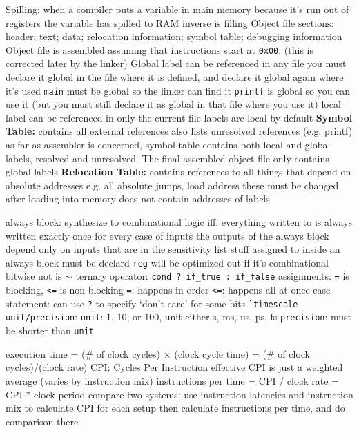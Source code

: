 \documentclass[12pt]{article}
\begin{document}
\begin{spacing}{0.8}
\begin{multicols*}{2}
\begin{flushleft}
\begin{outline}[longenum]
  \1 Spilling: when a compiler puts a variable in main memory because it's run out of registers
    \2 the variable has spilled to RAM
    \2 inverse is filling
  \1 Object file sections: header; text; data; relocation information; symbol table; debugging information
    \2 Object file is assembled assuming that instructions start at \verb|0x00|. (this is corrected later by the linker)
  \1 Global label can be referenced in any file
    \2 you must declare it global in the file where it is defined, and declare it global again where it's used
    \2 \verb|main| must be global so the linker can find it
    \2 \verb|printf| is global so you can use it (but you must still declare it as global in that file where you use it)
  \1 local label can be referenced in only the current file
    \2 labels are local by default
  \1 \textbf{Symbol Table:} contains all external references
    \2 also lists unresolved references (e.g. printf)
    \2 as far as assembler is concerned, symbol table contains both local and global labels, resolved and unresolved.
    \2 The final assembled object file only contains global labels
  \1 \textbf{Relocation Table:} contains references to all things that depend on absolute addresses
    \2 e.g. all absolute jumps, load address
    \2 these must be changed after loading into memory
    \2 does not contain addresses of labels



  \1 always block: synthesize to combinational logic iff:
    \2 everything written to is always written exactly once for every case of inputs
    \2 the outputs of the always block depend only on inputs that are in the sensitivity list
    \2 stuff assigned to inside an always block must be declard \verb|reg|
      \3 will be optimized out if it's combinational
  \1 bitwise not is $\sim$
  \1 ternary operator: \verb|cond ? if_true : if_false|
  \1 assignments: \verb|=| is blocking, \verb|<=| is non-blocking
    \2 \verb|=|: happens in order
    \2 \verb|<=|: happens all at once
  \1 case statement: can use \verb|?| to specify `don't care' for some bits
  \1 \verb|`timescale unit/precision|:
    \2 \verb|unit|: 1, 10, or 100, unit either s, ms, us, ps, fs
    \2 \verb|precision|: must be shorter than \verb|unit|

  \1 execution time = (\# of clock cycles) $\times$ (clock cycle time)
    = (\# of clock cycles)/(clock rate) 
  \1 CPI: Cycles Per Instruction
    \2 effective CPI is just a weighted average (varies by instruction mix)
  \1 instructions per time = CPI / clock rate = CPI * clock period
  \1 compare two systems:
    \2 use instruction latencies and instruction mix to calculate CPI for each setup
    \2 then calculate instructions per time, and do comparison there 


\end{outline}
\end{flushleft}
\end{multicols*}
\end{spacing}
\end{document}

